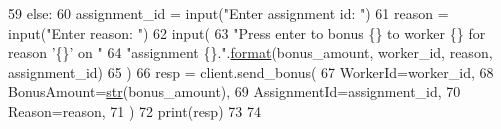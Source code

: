 \begin{DoxyCode}
59         \textcolor{keywordflow}{else}:
60             assignment\_id = input(\textcolor{stringliteral}{"Enter assignment id: "})
61         reason = input(\textcolor{stringliteral}{"Enter reason: "})
62         input(
63             \textcolor{stringliteral}{"Press enter to bonus \{\} to worker \{\} for reason '\{\}' on "}
64             \textcolor{stringliteral}{"assignment \{\}."}.\hyperlink{namespaceparlai_1_1chat__service_1_1services_1_1messenger_1_1shared__utils_a32e2e2022b824fbaf80c747160b52a76}{format}(bonus\_amount, worker\_id, reason, assignment\_id)
65         )
66         resp = client.send\_bonus(
67             WorkerId=worker\_id,
68             BonusAmount=\hyperlink{namespacegenerate__task__READMEs_a5b88452ffb87b78c8c85ececebafc09f}{str}(bonus\_amount),
69             AssignmentId=assignment\_id,
70             Reason=reason,
71         )
72         print(resp)
73 
74 
\end{DoxyCode}
